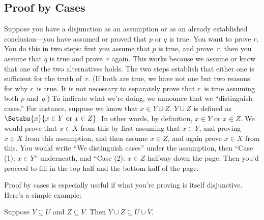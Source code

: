 \documentclass[../../../include/open-logic-section]{subfiles}
\begin{document}
\subsection{Proof by Cases}

Suppose you have a disjunction as an assumption or as an already
established conclusion---you have assumed or proved that $p$ or $q$ is
true.  You want to prove $r$.  You do this in two steps: first you
assume that $p$ is true, and prove~$r$, then you assume that $q$ is
true and prove~$r$ again.  This works because we assume or know that
one of the two alternatives holds. The two steps establish that either
one is sufficient for the truth of~$r$.  (If both are true, we have
not one but two reasons for why $r$~is true. It is not necessary to
separately prove that $r$~is true assuming both $p$ and~$q$.)  To
indicate what we're doing, we announce that we ``distinguish cases.''
For instance, suppose we know that $x \in Y \cup Z$.  $Y \cup Z$ is
defined as $\Setabs{x}{x \in Y \text{ or } x \in Z}$. In other words,
by definition, $x \in Y$ or $x \in Z$. We would prove that $x \in X$
from this by first assuming that $x \in Y$, and proving $x \in X$ from
this assumption, and then assume $x \in Z$, and again prove $x \in X$
from this.  You would write ``We distinguish cases'' under the
assumption, then ``Case (1): $x \in Y$'' underneath, and ``Case (2):
$x \in Z$ halfway down the page. Then you'd proceed to fill in the top
half and the bottom half of the page.

Proof by cases is especially useful if what you're proving is itself
disjunctive. Here's a simple example:

\begin{prop}
Suppose $Y \subseteq U$ and $Z \subseteq V$. Then $Y \cup Z \subseteq
U \cup V$.
\end{prop}
\end{document}
